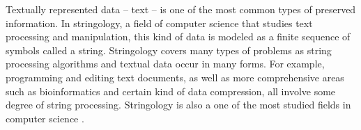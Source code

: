 \documentclass[english,twoside,censored,csm,algorithms-track-2020]{HYthesisML}
\theoremstyle{plain}
\theoremstyle{definition}
\begin{document}







Textually represented data -- text -- is one of the most common types of preserved information.
In stringology, a field of computer science that studies text processing and manipulation,
this kind of data is modeled as a finite sequence of symbols called a string. Stringology covers
many types of problems as string processing algorithms and textual data occur in many forms.
For example, programming and editing text documents, as well as more comprehensive areas such as
bioinformatics and certain kind of data compression, all involve some degree of string processing.
Stringology is also a one of the most studied fields in computer science \citep{Crochemore03}.
\end{document}
